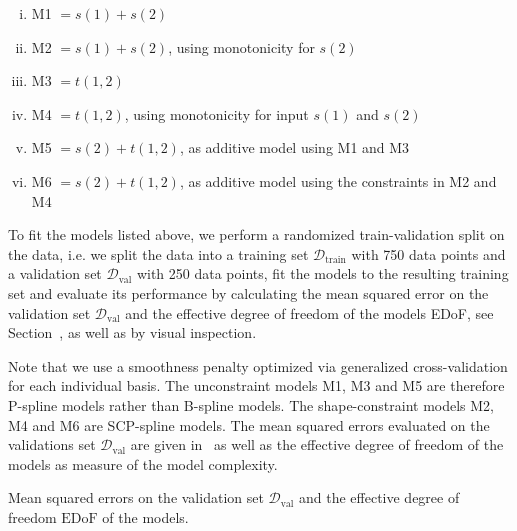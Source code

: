 \begin{enumerate}[(i)]
	\item M1 $= s(1) + s(2)$
	\item M2 $= s(1) + s(2)$, using monotonicity for $s(2)$
	\item M3 $= t(1,2)$
	\item M4 $= t(1,2)$, using monotonicity for input $s(1)$ and $s(2)$
	\item M5 $= s(2) + t(1,2)$, as additive model using M1 and M3
	\item M6 $= s(2) + t(1,2)$, as additive model using the constraints in M2 and M4
\end{enumerate}
%
To fit the models listed above, we perform a randomized train-validation split on the data, i.e. we split the data into a training set $\mathcal{D}_{\text{train}}$ with 750 data points and a validation set $\mathcal{D}_{\text{val}}$ with 250 data points, fit the models to the resulting training set and evaluate its performance by calculating the mean squared error on the validation set $\mathcal{D}_{\text{val}}$ and the effective degree of freedom of the models EDoF, see Section~, as well as by visual inspection.

Note that we use a smoothness penalty optimized via generalized cross-validation for each individual basis. The unconstraint models M1, M3 and M5 are therefore P-spline models rather than B-spline models. The shape-constraint models M2, M4 and M6 are SCP-spline models. The mean squared errors evaluated on the validations set $\mathcal{D}_{\text{val}}$ are given in~ as well as the effective degree of freedom of the models as measure of the model complexity. 

\begin{table}[H]
	\begin{center}
	\end{center}
	\caption{Mean squared errors on the validation set $\mathcal{D}_{\text{val}}$ and the effective degree of freedom $\text{EDoF}$ of the models.}
	\label{tab:bosch-mse-val}
\end{table}

